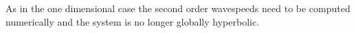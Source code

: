   As in the one dimensional case the second order wavespeeds need to be computed
  numerically and the system is no longer globally hyperbolic.






